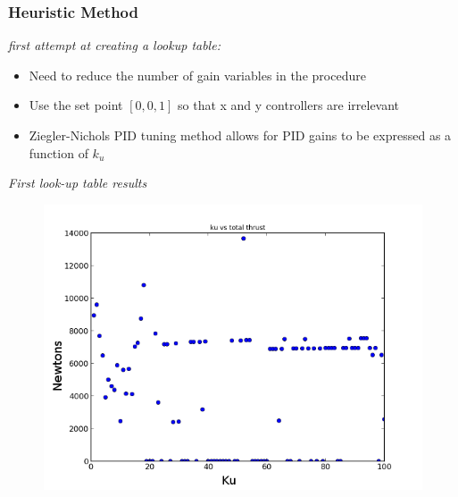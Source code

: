 \documentclass{beamer}
\begin{document}
\begin{frame}

\frametitle{Heuristic Method}

\textit{first attempt at creating a lookup table:}

\begin{itemize}
\item Need to reduce the number of gain variables in the procedure
\item Use the set point  $[0,0,1]$ so that x and y controllers are irrelevant
\item Ziegler-Nichols PID tuning method allows for PID gains to be expressed as a function of $k_u$
\end{itemize}

\end{frame}

\begin{frame}
\textit{First look-up table results}
\begin{figure}[htbp]
	\centering
		\includegraphics[width=\textwidth]{Figures/kuvsthrust.png}
	\label{fig:ku vs thrust}
\end{figure}

\end{frame}

\end{document}
